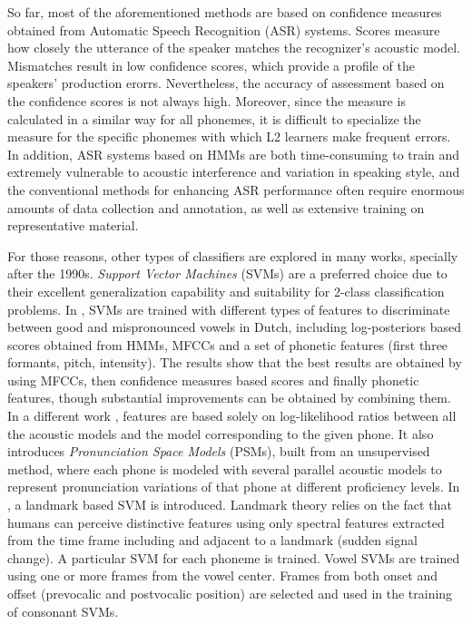 So far, most of the aforementioned methods are based on confidence measures 
obtained from Automatic Speech Recognition (ASR) systems. 
Scores measure how closely the utterance of the speaker matches the recognizer's
acoustic model. Mismatches result in low confidence scores, which provide a profile of the 
speakers' production erorrs. Nevertheless, the accuracy of assessment based on the
confidence scores is not always high. Moreover, since the measure is calculated in a similar
way for all phonemes, it is difficult to specialize the measure for the specific 
phonemes with which L2 learners make frequent errors. In addition,
ASR systems based on HMMs are both time-consuming to train and extremely vulnerable to
acoustic interference and variation in speaking style, and the conventional methods for
enhancing ASR performance often require enormous amounts of data collection and annotation,
as well as extensive training on representative material.

For those reasons, other types of classifiers are explored in many works, specially after
the 1990s. \textit{Support Vector Machines} (SVMs) are a preferred choice 
due to their excellent generalization capability and suitability for 2-class classification
problems. 
In \cite{detection_mispronunciation_dutch_vowel}, SVMs are trained with different types of
features to discriminate between good and mispronounced vowels in Dutch, including log-posteriors
based scores obtained from HMMs, MFCCs and a set of 
phonetic features (first three formants, pitch, intensity). The results show that the best 
results are obtained by using MFCCs, then confidence measures based scores and finally phonetic
features, though substantial improvements can be obtained by combining them.
In a different work \cite{svm_space_models}, features are based solely on
log-likelihood ratios between all the acoustic models and the model corresponding to the given
phone. It also introduces \textit{Pronunciation Space Models} (PSMs), 
built from an unsupervised method, where
each phone is modeled with several parallel acoustic models to represent pronunciation 
variations of that phone at different proficiency levels.
In \cite{landmark_svm}\cite{landmark_svm_2}, a landmark based 
SVM is introduced. Landmark theory relies on the fact that humans can perceive distinctive
features using only spectral features extracted from the time frame including and adjacent to
a landmark (sudden signal change). A particular SVM for each phoneme is trained. Vowel SVMs are 
trained using one or more frames from the vowel center. Frames from both onset and offset
(prevocalic and postvocalic position) are selected and used in the training of consonant
SVMs.

